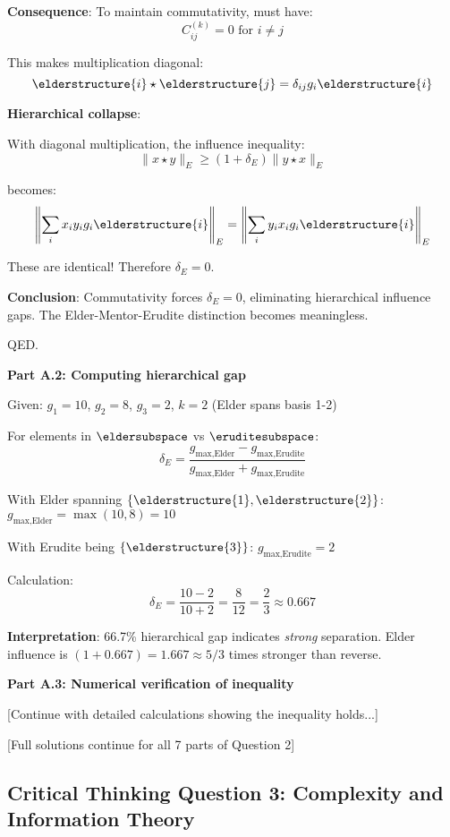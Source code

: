 \textbf{Consequence}: To maintain commutativity, must have:
$$C_{ij}^{(k)} = 0 \text{ for } i \neq j$$

This makes multiplication diagonal:
$$\elderstructure{i} \star \elderstructure{j} = \delta_{ij} g_i \elderstructure{i}$$

\textbf{Hierarchical collapse}:

With diagonal multiplication, the influence inequality:
$$\|x \star y\|_E \geq (1+\delta_E) \|y \star x\|_E$$

becomes:
$$\left\|\sum_i x_i y_i g_i \elderstructure{i}\right\|_E = \left\|\sum_i y_i x_i g_i \elderstructure{i}\right\|_E$$

These are identical! Therefore $\delta_E = 0$.

\textbf{Conclusion}: Commutativity forces $\delta_E = 0$, eliminating hierarchical influence gaps. The Elder-Mentor-Erudite distinction becomes meaningless.

QED.

\textbf{Part A.2: Computing hierarchical gap}

Given: $g_1 = 10$, $g_2 = 8$, $g_3 = 2$, $k=2$ (Elder spans basis 1-2)

For elements in $\eldersubspace$ vs $\eruditesubspace$:
$$\delta_E = \frac{g_{\text{max,Elder}} - g_{\text{max,Erudite}}}{g_{\text{max,Elder}} + g_{\text{max,Erudite}}}$$

With Elder spanning $\{\elderstructure{1}, \elderstructure{2}\}$: $g_{\text{max,Elder}} = \max(10, 8) = 10$

With Erudite being $\{\elderstructure{3}\}$: $g_{\text{max,Erudite}} = 2$

Calculation:
$$\delta_E = \frac{10 - 2}{10 + 2} = \frac{8}{12} = \frac{2}{3} \approx 0.667$$

\textbf{Interpretation}: 66.7\% hierarchical gap indicates \textit{strong} separation. Elder influence is $(1 + 0.667) = 1.667 \approx 5/3$ times stronger than reverse.

\textbf{Part A.3: Numerical verification of inequality}

[Continue with detailed calculations showing the inequality holds...]

[Full solutions continue for all 7 parts of Question 2]

\subsection*{Critical Thinking Question 3: Complexity and Information Theory}

